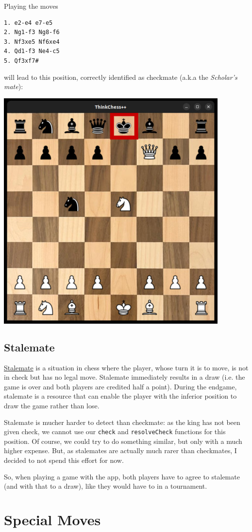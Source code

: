 Playing the moves
\begin{verbatim}
1. e2-e4 e7-e5
2. Ng1-f3 Ng8-f6
3. Nf3xe5 Nf6xe4
4. Qd1-f3 Ne4-c5
5. Qf3xf7#
\end{verbatim}

will lead to this position, correctly identified as checkmate (a.k.a
the \emph{Scholar's mate}):

\begin{center}
\includegraphics[width=.5\linewidth]{img/checkmate.jpg}
\end{center}

\subsection{Stalemate}\label{subsec:stale}

\href{https://en.wikipedia.org/wiki/Stalemate}{Stalemate} is a situation in chess where the player,
whose turn it is to move, is not in check but has no legal move.
Stalemate immediately results in a draw (i.e. the game is over and both players are credited half
a point).
During the endgame, stalemate is a resource that can enable the player with the inferior position
to draw the game rather than lose.

Stalemate is mucher harder to detect than checkmate: as the king has not been given check,
we cannot use our \texttt{check} and \texttt{resolveCheck} functions for this position.
Of course, we could try to do something similar, but only with a much higher expense.
But, as stalemates are actually much rarer than checkmates, I decided to not spend this effort for now.

So, when playing a game with the app, both players have to agree to stalemate (and with that to a draw),
like they would have to in a tournament.

\section{Special Moves}\label{sec:specmoves}

